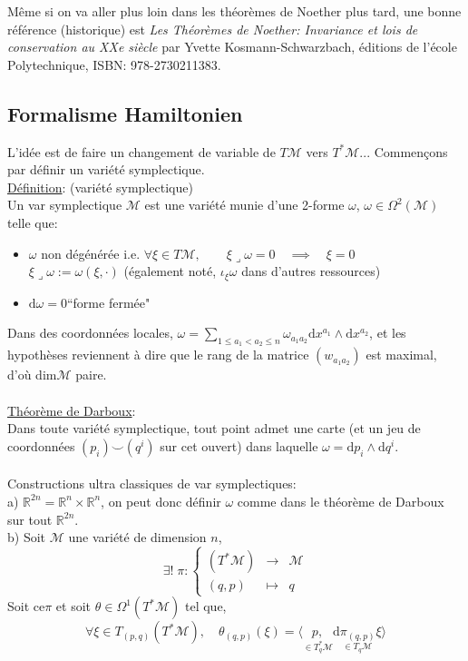 \documentclass[a4paper,11pt]{article}
\renewcommand{\d}{{\mathrm{d}}}
\begin{document}
Même si on va aller plus loin dans les théorèmes de Noether plus tard, une bonne référence (historique) est \emph{Les Théorèmes de Noether: Invariance et lois de conservation au XXe siècle} par  Yvette Kosmann-Schwarzbach, éditions de l'école Polytechnique, ISBN: 978-2730211383.


\subsection{Formalisme Hamiltonien}
L'idée est de faire un changement de variable de $T\mathcal{M}$ vers $T^*\mathcal{M}$... Commençons par définir un variété symplectique.
\\
\underline{Définition}: (variété symplectique)\\
Un var symplectique $\mathcal{M}$ est une variété munie d'une 2-forme $\omega$, $\omega \in \Omega^2(\mathcal{M})$ telle que:
\begin{itemize}
\item $\omega$ non dégénérée i.e. $\forall \xi\in T\mathcal{M}, \quad \quad \xi \lrcorner \omega = 0 \quad \implies \quad \xi =0$\\
$\xi \lrcorner \omega:= \omega(\xi,\cdot)$ (également noté, $\iota_\xi \omega$ dans d'autres ressources)
\item $\d \omega = 0$\quad\quad ``forme fermée"
\end{itemize}

Dans des coordonnées locales, $\omega = \sum_{1\leq a_1 < a_2\leq n} \omega_{a_1a_2} \d x^{a_1} \wedge \d x^{a_2}$, et les hypothèses reviennent à dire que le rang de la matrice $(w_{a_1a_2})$ est maximal, d'où dim$\mathcal{M}$ paire.\\
\\
\underline{Théorème de Darboux}:\\
Dans toute variété symplectique, tout point admet une carte (et un jeu de coordonnées $(p_i)\!\!\smile\!\!(q^i)$ sur cet ouvert) dans laquelle $\omega = \d p_i\wedge\d q^i$.\\
\\
Constructions ultra classiques de var symplectiques:\\
a) $\mathbb{R}^{2n}=\mathbb{R}^n\times\mathbb{R}^n$, on peut donc définir $\omega$ comme dans le théorème de Darboux sur tout $\mathbb{R}^{2n}$.
\\
b) Soit $\mathcal{M}$ une variété de dimension $n$, 
\begin{equation*}
\exists!\; \pi : \left\{\begin{matrix}
(T^*\mathcal{M}) & \to & \mathcal{M} \\
(q,p) & \mapsto & q
\end{matrix}\right.
\end{equation*}
Soit ce$\pi$ et soit $\theta \in \Omega^1 (T^*\mathcal{M})$ tel que,
$$\forall \xi \in T_{(p,q)}(T^*\mathcal{M}), \quad \theta_{(q,p)}(\xi) = \langle \underset{\in T_q^*\mathcal{M}}{p,} \underset{\in T_q\mathcal{M}}{\d \pi_{(q,p)} \xi} \rangle$$
\end{document}
